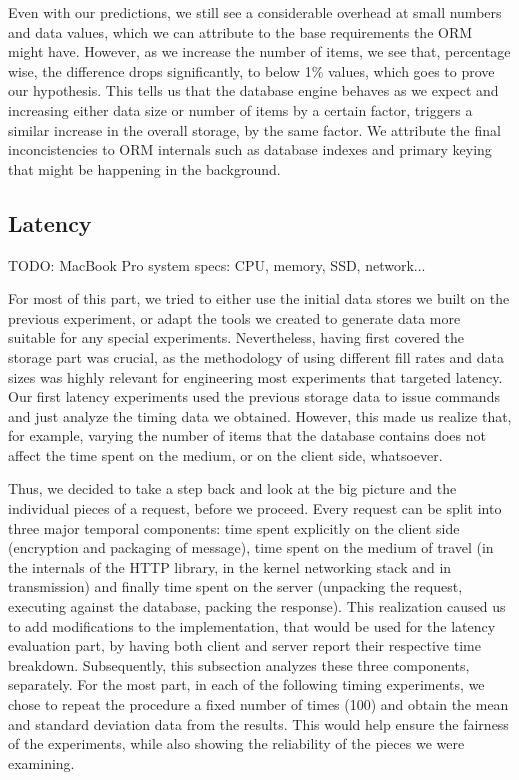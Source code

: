 Even with our predictions, we still see a considerable overhead at small numbers and data values, which we can attribute to the base requirements the ORM might have.
However, as we increase the number of items, we see that, percentage wise, the difference drops significantly, to below 1\% values, which goes to prove our hypothesis.
This tells us that the database engine behaves as we expect and increasing either data size or number of items by a certain factor, triggers a similar increase in the overall storage, by the same factor.
We attribute the final inconcistencies to ORM internals such as database indexes and primary keying that might be happening in the background.

\subsection{Latency}
TODO: MacBook Pro system specs: CPU, memory, SSD, network...

For most of this part, we tried to either use the initial data stores we built on the previous experiment, or adapt the tools we created to generate data more suitable for any special experiments.
Nevertheless, having first covered the storage part was crucial, as the methodology of using different fill rates and data sizes was highly relevant for engineering most experiments that targeted latency.
Our first latency experiments used the previous storage data to issue  commands and just analyze the timing data we obtained.
However, this made us realize that, for example, varying the number of items that the database contains does not affect the time spent on the medium, or on the client side, whatsoever.

Thus, we decided to take a step back and look at the big picture and the individual pieces of a request, before we proceed.
Every request can be split into three major temporal components: time spent explicitly on the client side (encryption and packaging of message), time spent on the medium of travel (in the internals of the HTTP library, in the kernel networking stack and in transmission) and finally time spent on the server (unpacking the request, executing against the database, packing the response).
This realization caused us to add modifications to the implementation, that would be used for the latency evaluation part, by having both client and server report their respective time breakdown.
Subsequently, this subsection analyzes these three components, separately.
For the most part, in each of the following timing experiments, we chose to repeat the procedure a fixed number of times (100) and obtain the mean and standard deviation data from the results.
This would help ensure the fairness of the experiments, while also showing the reliability of the pieces we were examining.

